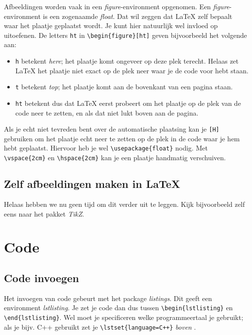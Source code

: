 Afbeeldingen worden vaak in een \emph{figure}-environment opgenomen. Een
\emph{figure}-environment is een zogenaamde \emph{float}. Dat wil zeggen dat
\LaTeX{} zelf bepaalt waar het plaatje geplaatst wordt. Je kunt hier natuurlijk
wel invloed op uitoefenen. De letters \verb|ht| in \verb+\begin{figure}[ht]+
geven bijvoorbeeld het volgende aan:
\begin{itemize}
	\item \verb+h+ betekent \emph{here}; het plaatje komt ongeveer op deze plek
terecht. Helaas zet \LaTeX{} het plaatje niet exact op de plek neer waar je de
code voor hebt staan.
	\item \verb+t+ betekent \emph{top}; het plaatje komt aan de bovenkant van
	een pagina staan.
	\item \verb+ht+ betekent dus dat \LaTeX{} eerst probeert om het plaatje op
	de plek van de code neer te zetten, en als dat niet lukt boven aan de
	pagina.
\end{itemize}
Als je echt niet tevreden bent over de automatische plaatsing kan je \verb+[H]+
gebruiken om het plaatje echt neer te zetten op de plek in de code waar je hem
hebt geplaatst. Hiervoor heb je wel \verb&\usepackage{float}& nodig. Met
\verb.\vspace{2cm}. en \verb.\hspace{2cm}. kan je een plaatje handmatig
verschuiven.

\subsection{Zelf afbeeldingen maken in \LaTeX}
Helaas hebben we nu geen tijd om dit verder uit te leggen. Kijk bijvoorbeeld
zelf eens naar het pakket \emph{TikZ}.



\section{Code}

\subsection{Code invoegen}

Het invoegen van code gebeurt met het package \textit{listings}. Dit geeft een
environment \emph{lstlisting}. Je zet je code dan dus tussen
\verb+\begin{lstlisting}+ en \verb+\end{lstlisting}+. Wel moet je specificeren
welke programmeertaal je gebruikt; als je bijv. C++ gebruikt zet je
\verb|\lstset{language=C++}| \emph{boven} \verb++.

